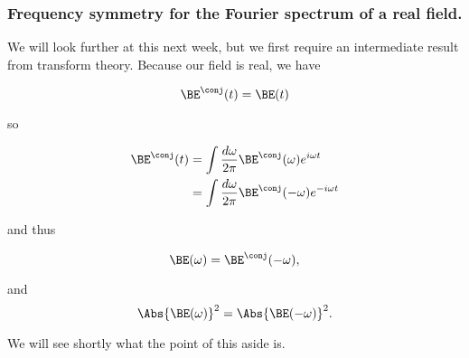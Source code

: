 \subsubsection{Frequency symmetry for the Fourier spectrum of a real field.}

We will look further at this next week, but we first require an intermediate result from transform theory.  Because our field is real, we have

\begin{equation}\label{eqn:qmTwoL7:610}
\BE^\conj(t) = \BE(t)
\end{equation}

so

\begin{align*}
\BE^\conj(t)
&= \int \frac{d\omega}{2 \pi} \BE^\conj(\omega) e^{i \omega t} \\
&= \int \frac{d\omega}{2 \pi} \BE^\conj(-\omega) e^{-i \omega t} \\
\end{align*}

and thus

\begin{equation}\label{eqn:qmTwoL7:630}
\BE(\omega) = \BE^\conj(-\omega),
\end{equation}

and
\begin{equation}\label{eqn:qmTwoL7:650}
\Abs{\BE(\omega)}^2 = \Abs{\BE(-\omega)}^2.
\end{equation}

We will see shortly what the point of this aside is.

\EndArticle
